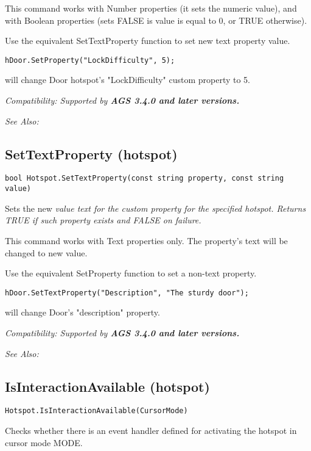 This command works with Number properties (it sets the numeric value), and with Boolean
properties (sets FALSE is value is equal to 0, or TRUE otherwise).

Use the equivalent SetTextProperty function to set new text property value.

\begin{verbatim}
hDoor.SetProperty("LockDifficulty", 5);
\end{verbatim}
will change Door hotspot's "LockDifficulty" custom property to 5.

\it{Compatibility:} Supported by \bf{AGS 3.4.0} and later versions.

\it{See Also:} 


\subsection{SetTextProperty (hotspot)}\label{Hotspot.SetTextProperty}%

\begin{verbatim}
bool Hotspot.SetTextProperty(const string property, const string value)
\end{verbatim}
Sets the new \it{value} text for the custom \it{property} for the specified hotspot. Returns
TRUE if such property exists and FALSE on failure.

This command works with Text properties only. The property's text will be
changed to new value.

Use the equivalent SetProperty function to set a non-text property.

\begin{verbatim}
hDoor.SetTextProperty("Description", "The sturdy door");
\end{verbatim}
will change Door's "description" property.

\it{Compatibility:} Supported by \bf{AGS 3.4.0} and later versions.

\it{See Also:} 



\subsection{IsInteractionAvailable (hotspot)}\label{Hotspot.IsInteractionAvailable}%

\begin{verbatim}
Hotspot.IsInteractionAvailable(CursorMode)
\end{verbatim}
Checks whether there is an event handler defined for activating the hotspot
in cursor mode MODE.

